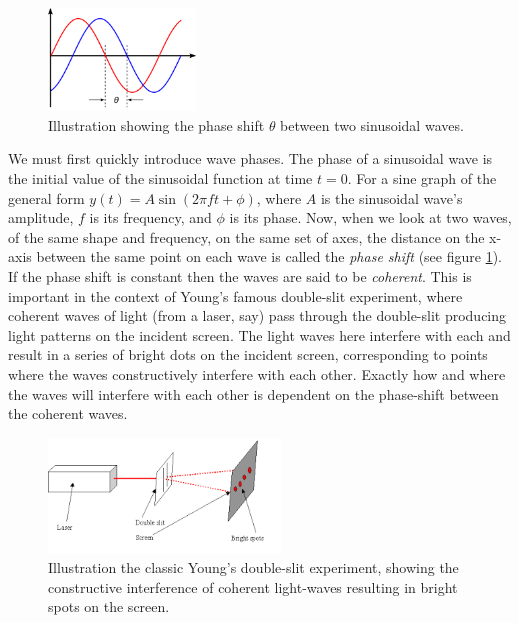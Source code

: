 \documentclass{article}
\begin{document}
\begin{figure}[h]
\centering
\includegraphics[width=0.35\textwidth]{phase_shift.png}
\caption{Illustration showing the phase shift $\theta$ between two sinusoidal waves.}
\label{phase_shift}
\end{figure}

We must first quickly introduce wave phases. The phase of a sinusoidal wave is the initial value of the sinusoidal function at time $t=0$. For a sine graph of the general form $y(t) = A \sin \left( 2\pi f t + \phi \right)$, where $A$ is the sinusoidal wave's amplitude, $f$ is its frequency, and $\phi$ is its phase. Now, when we look at two  waves, of the same shape and frequency, on the same set of axes, the distance on the x-axis between the same point on each wave is called the \emph{phase shift} (see figure \ref{phase_shift}). If the phase shift is constant then the waves are said to be \emph{coherent}. This is important in the context of Young's famous double-slit experiment, where coherent waves of light (from a laser, say) pass through the double-slit producing light patterns on the incident screen. The light waves here interfere with each and result in a series of bright dots on the incident screen, corresponding to points where the waves constructively interfere with each other. Exactly how and where the waves will interfere with each other is dependent on the phase-shift between the coherent waves.

\begin{figure}[h]
\centering
\includegraphics[width=0.55\textwidth]{youngs.png}
\caption{Illustration the classic Young's double-slit experiment, showing the constructive interference of coherent light-waves resulting in bright spots on the screen.}
\label{youngs}
\end{figure}
\end{document}
